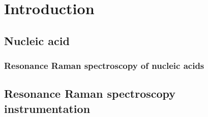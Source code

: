 \chapter{Introduction}

\section{Nucleic acid}

\subsection{Resonance Raman spectroscopy of nucleic acids}

\section{Resonance Raman spectroscopy instrumentation}

